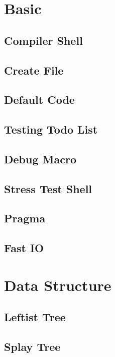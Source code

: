 \section{Basic}
\subsection{Compiler Shell}

\subsection{Create File}

\subsection{Default Code}

\subsection{Testing Todo List}

\subsection{Debug Macro}

\subsection{Stress Test Shell}

\subsection{Pragma}

\subsection{Fast IO}


\section{Data Structure}
\subsection{Leftist Tree}

\subsection{Splay Tree}

